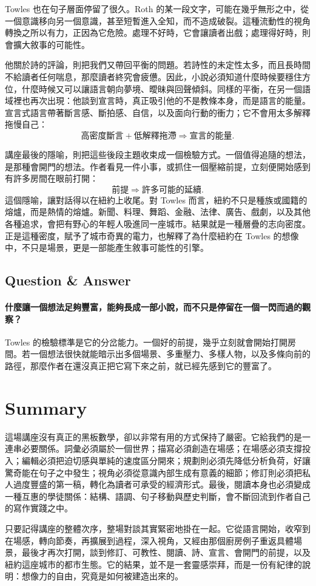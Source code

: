 Towles 也在句子層面停留了很久。Roth 的某一段文字，可能在幾乎無形之中，從一個意識移向另一個意識，甚至短暫進入全知，而不造成破裂。這種流動性的視角轉換之所以有力，正因為它危險。處理不好時，它會讓讀者出戲；處理得好時，則會擴大敘事的可能性。

他關於詩的評論，則把我們又帶回平衡的問題。若詩性的未定性太多，而且長時間不給讀者任何喘息，那麼讀者終究會疲憊。因此，小說必須知道什麼時候要穩住方位，什麼時候又可以讓語言朝向夢境、曖昧與回聲傾斜。同樣的平衡，在另一個語域裡也再次出現：他談到宣言時，真正吸引他的不是教條本身，而是語言的能量。宣言式語言帶著斷言感、斷拍感、自信，以及面向行動的衝力；它不會用太多解釋拖慢自己：
\begin{equation}
\text{高密度斷言} + \text{低解釋拖滯} \Rightarrow \text{宣言的能量}.
\end{equation}

講座最後的隱喻，則把這些後段主題收束成一個檢驗方式。一個值得追隨的想法，是那種會開門的想法。作者看見一件小事，或抓住一個壓縮前提，立刻便開始感到有許多房間在眼前打開：
\begin{equation}
\text{前提} \Rightarrow \text{許多可能的延續}.
\end{equation}
這個隱喻，讓對話得以在紐約上收尾。對 Towles 而言，紐約不只是種族或國籍的熔爐，而是熱情的熔爐。新聞、料理、舞蹈、金融、法律、廣告、戲劇，以及其他各種追求，會把有野心的年輕人吸進同一座城市。結果就是一種層疊的志向密度。正是這種密度，賦予了城市奇異的電力，也解釋了為什麼紐約在 Towles 的想像中，不只是場景，更是一部能產生敘事可能性的引擎。

\subsection{Question \& Answer}

\paragraph{什麼讓一個想法足夠豐富，能夠長成一部小說，而不只是停留在一個一閃而過的觀察？}

Towles 的檢驗標準是它的分岔能力。一個好的前提，幾乎立刻就會開始打開房間。若一個想法很快就能暗示出多個場景、多重壓力、多樣人物，以及多條向前的路徑，那麼作者在還沒真正把它寫下來之前，就已經先感到它的豐富了。

\section{Summary}

這場講座沒有真正的黑板數學，卻以非常有用的方式保持了嚴密。它給我們的是一連串必要關係。詞彙必須屬於一個世界；描寫必須創造在場感；在場感必須支撐投入；編輯必須把迫切感與單純的速度區分開來；規劃則必須先降低分析負荷，好讓驚奇能在句子之中發生；視角必須從意識內部生成有意義的細節；修訂則必須把私人過度豐盛的第一稿，轉化為讀者可承受的經濟形式。最後，閱讀本身也必須變成一種互惠的學徒關係：結構、語調、句子移動與歷史判斷，會不斷回流到作者自己的寫作實踐之中。

只要記得講座的整體次序，整場對談其實緊密地掛在一起。它從語言開始，收窄到在場感，轉向節奏，再擴展到過程，深入視角，又經由那個廚房例子重返具體場景，最後才再次打開，談到修訂、可教性、閱讀、詩、宣言、會開門的前提，以及紐約這座城市的都市生態。它的結果，並不是一套靈感崇拜，而是一份有紀律的說明：想像力的自由，究竟是如何被建造出來的。